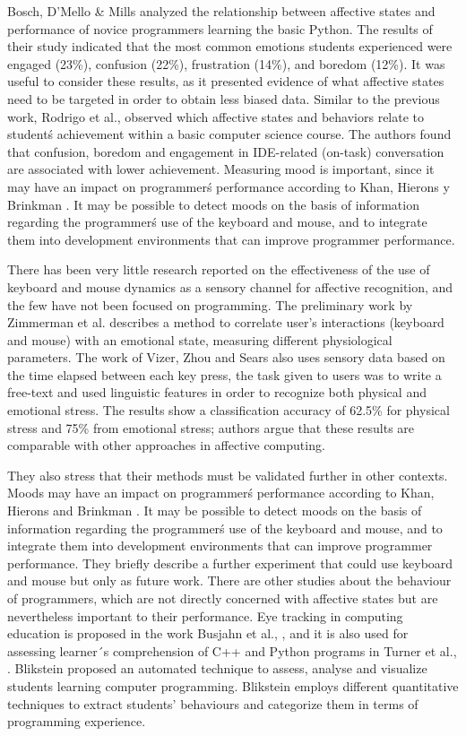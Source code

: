\documentclass[a4paper,twoside]{article}
\begin{document}
Bosch, D'Mello \& Mills \cite{bosch2013emotions} analyzed the relationship between affective states
and performance of novice programmers learning the basic Python. The results of their study
indicated that the most common emotions students experienced were engaged
(23\%), confusion (22\%), frustration (14\%), and boredom (12\%). It was useful
to consider these results, as it presented evidence of what affective states
need to be targeted in order to obtain less biased data. Similar to
the previous work, Rodrigo et al., \cite{rodrigo2009affective} observed which affective states and
behaviors relate to student\'s achievement within a basic computer science
course. The authors found that confusion, boredom and engagement in IDE-related
(on-task) conversation are associated with lower achievement. Measuring mood is important,
since it may have an impact on programmer\'s performance according
to Khan, Hierons y Brinkman \cite{khan2007mood}. It may be possible to detect moods
on the basis of information regarding the programmer\'s use of the keyboard and
mouse, and to integrate them into development environments that can improve
programmer performance.

There has been very little research reported on the effectiveness of
the use of keyboard and mouse dynamics as a sensory channel for
affective recognition, and the few have not been focused on
programming. The preliminary work by Zimmerman et
al. \cite{zimmermann2003affective} describes a method to correlate
user’s interactions (keyboard and mouse) with an emotional state,
measuring different physiological parameters. The work of Vizer, Zhou
and Sears \cite{vizer2009automated} also uses sensory data based on
the time elapsed between each key press, the task given to users was
to write a free-text and used linguistic features in order to
recognize both physical and emotional stress. The results show a
classification accuracy of 62.5\% for physical stress and 75\% from
emotional stress; authors argue that these results are comparable with
other approaches in affective computing.

They also stress that their methods must be validated further in
other contexts. Moods may have an impact on programmer\'s performance according
to Khan, Hierons and Brinkman \cite{khan2007mood}. It may be possible to detect moods
on the basis of information regarding the programmer\'s use of the keyboard and
mouse, and to integrate them into development environments that can improve
programmer performance. They briefly describe a further experiment that could
use keyboard and mouse but only as future work. There are other studies about
the behaviour of programmers, which are not directly concerned with affective
states but are nevertheless important to their performance. Eye tracking in
computing education is proposed in the work Busjahn et al., \cite{busjahn2014eye}, and it is
also used for assessing learner´s comprehension of C++ and Python programs in
Turner et al., \cite{turner2014eye}. Blikstein \cite{blikstein2011using} proposed
an automated technique to
assess, analyse and visualize students learning computer programming. Blikstein
employs different quantitative techniques to extract students’ behaviours and
categorize them in terms of programming experience.
\end{document}

